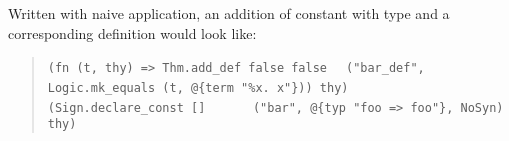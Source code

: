 \begin{isabellebody}
\begin{isamarkuptext}
  Written with naive application, an addition of constant
   with type  and
  a corresponding definition  would look like:

  \begin{quotation}
   \verb|(fn (t, thy) => Thm.add_def false false|\isasep\isanewline%
\verb|  ("bar_def", Logic.mk_equals (t, @{term "%x. x"})) thy)|\isasep\isanewline%
\verb|    (Sign.declare_const []|\isasep\isanewline%
\verb|      ("bar", @{typ "foo => foo"}, NoSyn) thy)|
  \end{quotation}


\end{isamarkuptext}
\end{isabellebody}
